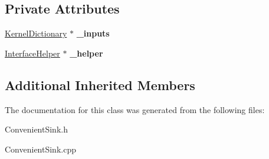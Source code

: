 \subsection*{Private Attributes}
\begin{DoxyCompactItemize}
\item 
\mbox{\label{class_convenient_sink_a5e10483bed822b5150224609fe892fcb}} 
\hyperlink{class_kernel_dictionary}{Kernel\+Dictionary} $\ast$ {\bfseries \+\_\+inputs}
\item 
\mbox{\label{class_convenient_sink_a988fc174a2e5b55a944fe2bc74994e55}} 
\hyperlink{class_interface_helper}{Interface\+Helper} $\ast$ {\bfseries \+\_\+helper}
\end{DoxyCompactItemize}
\subsection*{Additional Inherited Members}


The documentation for this class was generated from the following files\+:\begin{DoxyCompactItemize}
\item 
Convenient\+Sink.\+h\item 
Convenient\+Sink.\+cpp\end{DoxyCompactItemize}
